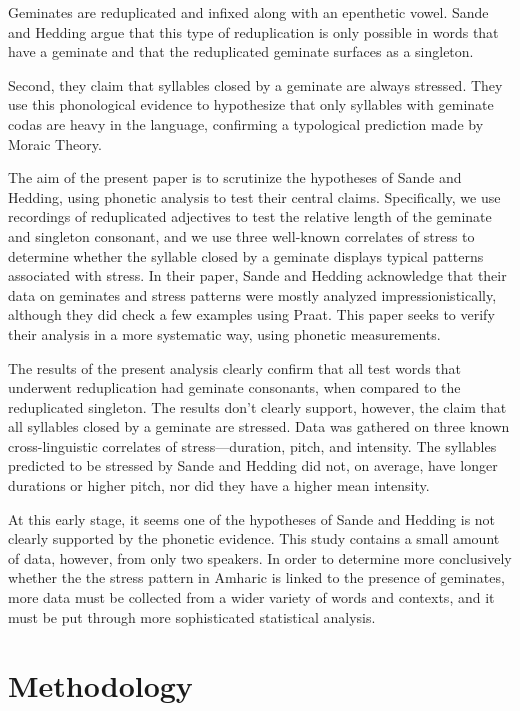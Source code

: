 \documentclass[12pt]{article}
\begin{document}
Geminates are reduplicated and infixed along with an epenthetic vowel. Sande and Hedding argue that this type of reduplication is only possible in words that have a geminate and that the reduplicated geminate surfaces as a singleton. 

Second, they claim that syllables closed by a geminate are always stressed. They use this phonological evidence to hypothesize that only syllables with geminate codas are heavy in the language, confirming a typological prediction made by Moraic Theory.

The aim of the present paper is to scrutinize the hypotheses of Sande and Hedding, using phonetic analysis to test their central claims. Specifically, we use recordings of reduplicated adjectives to test the relative length of the geminate and singleton consonant, and we use three well-known correlates of stress to determine whether the syllable closed by a geminate displays typical patterns associated with stress. In their paper, Sande and Hedding acknowledge that their data on geminates and stress patterns were mostly analyzed impressionistically, although they did check a few examples using Praat. This paper seeks to verify their analysis in a more systematic way, using phonetic measurements. 

The results of the present analysis clearly confirm that all test words that underwent reduplication had geminate consonants, when compared to the reduplicated singleton. The results don't clearly support, however, the claim that all syllables closed by a geminate are stressed. Data was gathered on three known cross-linguistic correlates of stress---duration, pitch, and intensity. The syllables predicted to be stressed by Sande and Hedding did not, on average, have longer durations or higher pitch, nor did they have a higher mean intensity. 

At this early stage, it seems one of the hypotheses of Sande and Hedding is not clearly supported by the phonetic evidence. This study contains a small amount of data, however, from only two speakers. In order to determine more conclusively whether the the stress pattern in Amharic is linked to the presence of geminates, more data must be collected from a wider variety of words and contexts, and it must be put through more sophisticated statistical analysis.

\section{Methodology}
\end{document}

